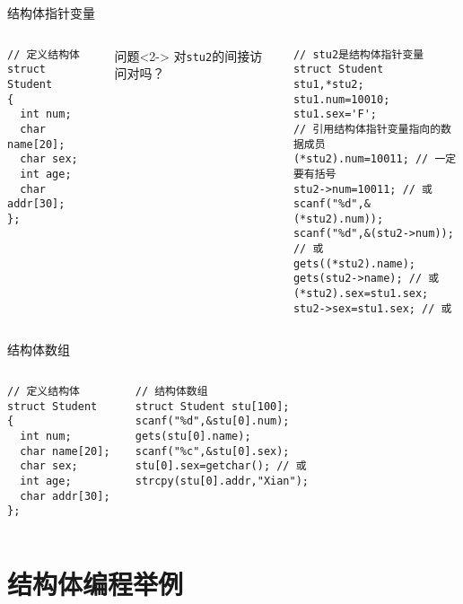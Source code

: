 \begin{frame}{结构体指针变量}
\vspace{-0.5cm}
\begin{columns}[T]
\begin{lstlisting}
// 定义结构体
struct Student 
{ 
  int num;
  char name[20];
  char sex;
  int age;
  char addr[30]; 
};
\end{lstlisting}
\begin{block}{问题}<2->
	对\lstinline|stu2|的间接访问对吗？
\end{block}
\begin{lstlisting}[frame=leftline]
// stu2是结构体指针变量
struct Student stu1,*stu2;
stu1.num=10010;
stu1.sex='F';
// 引用结构体指针变量指向的数据成员
(*stu2).num=10011; // 一定要有括号
stu2->num=10011; // 或
scanf("%d",&(*stu2).num));
scanf("%d",&(stu2->num)); // 或
gets((*stu2).name); 
gets(stu2->name); // 或
(*stu2).sex=stu1.sex; 
stu2->sex=stu1.sex; // 或
\end{lstlisting}
\end{columns}
\medskip
\end{frame}


\begin{frame}{结构体数组}
\begin{columns}[T]
\begin{lstlisting}
// 定义结构体
struct Student 
{ 
  int num;
  char name[20];
  char sex;
  int age;
  char addr[30]; 
};
\end{lstlisting}
\begin{lstlisting}[frame=leftline]
// 结构体数组
struct Student stu[100];
scanf("%d",&stu[0].num);
gets(stu[0].name);
scanf("%c",&stu[0].sex);
stu[0].sex=getchar(); // 或
strcpy(stu[0].addr,"Xian");
\end{lstlisting}
\end{columns}
\medskip
\end{frame}

\section{结构体编程举例}


